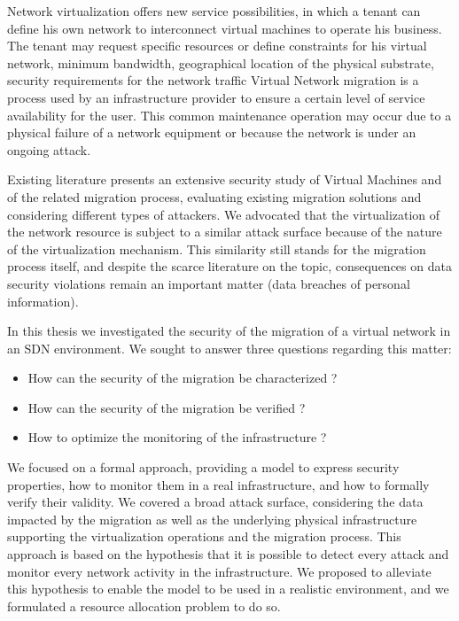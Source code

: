 
\label{sec:thesis_conclusion}
Network virtualization offers new service possibilities, in which a tenant can define his own network to interconnect virtual machines to operate his business. The tenant may request specific resources or define constraints for his virtual network, \eg minimum bandwidth, geographical location of the physical substrate, security requirements for the network traffic \etc
Virtual Network migration is a process used by an infrastructure provider to ensure a certain level of service availability for the user.
This common maintenance operation may occur due to a physical failure of a network equipment or because the network is under an ongoing attack.

Existing literature presents an extensive security study of Virtual Machines and of the related migration process, evaluating existing migration solutions and considering different types of attackers. We advocated that the virtualization of the network resource is subject to a similar attack surface because of the nature of the virtualization mechanism. This similarity still stands for the migration process itself, and despite the scarce literature on the topic, consequences on data security violations remain an important matter (\eg data breaches of personal information).

In this thesis we investigated the security of the migration of a virtual network in an SDN environment. 
We sought to answer three questions regarding this matter:

\begin{itemize}
    \item How can the security of the migration be characterized ?
    \item How can the security of the migration be verified ?
    \item How to optimize the monitoring of the infrastructure ? 
\end{itemize}

We focused on a formal approach, providing a model to express security properties, how to monitor them in a real infrastructure, and how to formally verify their validity. 
We covered a broad attack surface, considering the data impacted by the migration as well as the underlying physical infrastructure supporting the virtualization operations and the migration process. 
This approach is based on the hypothesis that it is possible to detect every attack and monitor every network activity in the infrastructure. 
We proposed to alleviate this hypothesis to enable the model to be used in a realistic environment, and we formulated a resource allocation problem to do so.

